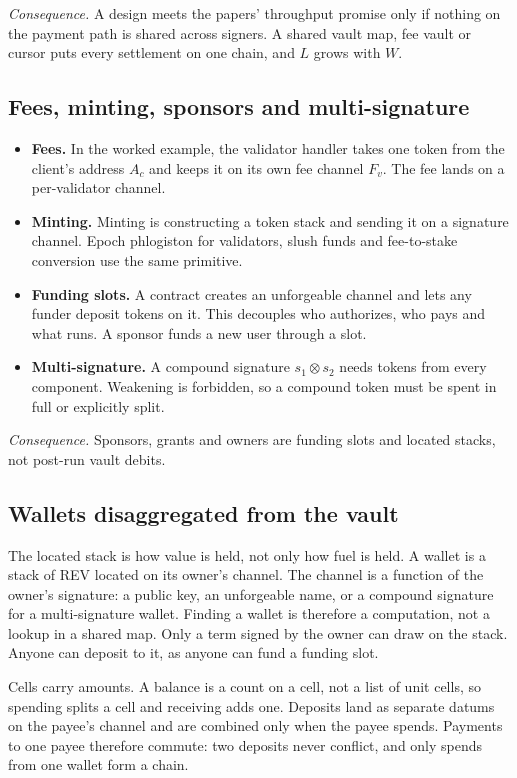 \documentclass[11pt]{article}
\begin{document}
\emph{Consequence.} A design meets the papers' throughput promise only if nothing on the payment path is shared across signers. A shared vault map, fee vault or cursor puts every settlement on one chain, and $L$ grows with $W$.

\subsection{Fees, minting, sponsors and multi-signature}

\begin{itemize}
\item \textbf{Fees.} In the worked example, the validator handler takes one token from the client's address $A_c$ and keeps it on its own fee channel $F_v$. The fee lands on a per-validator channel.
\item \textbf{Minting.} Minting is constructing a token stack and sending it on a signature channel. Epoch phlogiston for validators, slush funds and fee-to-stake conversion use the same primitive.
\item \textbf{Funding slots.} A contract creates an unforgeable channel and lets any funder deposit tokens on it. This decouples who authorizes, who pays and what runs. A sponsor funds a new user through a slot.
\item \textbf{Multi-signature.} A compound signature $s_1 \otimes s_2$ needs tokens from every component. Weakening is forbidden, so a compound token must be spent in full or explicitly split.
\end{itemize}

\emph{Consequence.} Sponsors, grants and owners are funding slots and located stacks, not post-run vault debits.

\subsection{Wallets disaggregated from the vault}

The located stack is how value is held, not only how fuel is held. A wallet is a stack of REV located on its owner's channel. The channel is a function of the owner's signature: a public key, an unforgeable name, or a compound signature for a multi-signature wallet. Finding a wallet is therefore a computation, not a lookup in a shared map. Only a term signed by the owner can draw on the stack. Anyone can deposit to it, as anyone can fund a funding slot.

Cells carry amounts. A balance is a count on a cell, not a list of unit cells, so spending splits a cell and receiving adds one. Deposits land as separate datums on the payee's channel and are combined only when the payee spends. Payments to one payee therefore commute: two deposits never conflict, and only spends from one wallet form a chain.
\end{document}
